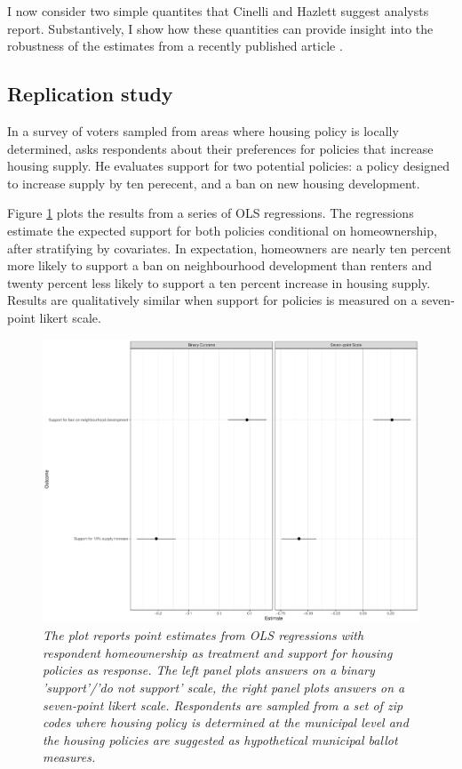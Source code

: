 \documentclass[hidelinks,11pt]{article}
\begin{document}
I now consider two simple quantites that Cinelli and Hazlett suggest analysts report. Substantively, I show how these quantities can provide insight into the robustness of the estimates from a recently published article \citet{hankinson2018}.

\subsection{Replication study}

In a survey of voters sampled from areas where housing policy is locally determined, \citet{hankinson2018} asks respondents about their preferences for policies that increase housing supply. He evaluates support for two potential policies: a policy designed to increase supply by ten perecent, and a ban on new housing development.

Figure \ref{hankinson1} plots the results from a series of OLS regressions. The regressions estimate the expected support for both policies conditional on homeownership, after stratifying by covariates. In expectation, homeowners are nearly ten percent more likely to support a ban on neighbourhood development than renters and twenty percent less likely to support a ten percent increase in housing supply. Results are qualitatively similar when support for policies is measured on a seven-point likert scale.

\begin{figure}
  \includegraphics[width=\linewidth]{../plots/hankinson1.pdf}
  \caption{\emph{The plot reports point estimates from OLS regressions with respondent homeownership as treatment and support for housing policies as response. The left panel plots answers on a binary 'support'/'do not support' scale, the right panel plots answers on a seven-point likert scale. Respondents are sampled from a set of zip codes where housing policy is determined at the municipal level and the housing policies are suggested as hypothetical municipal ballot measures.}}
  \label{hankinson1}
\end{figure}
\end{document}
